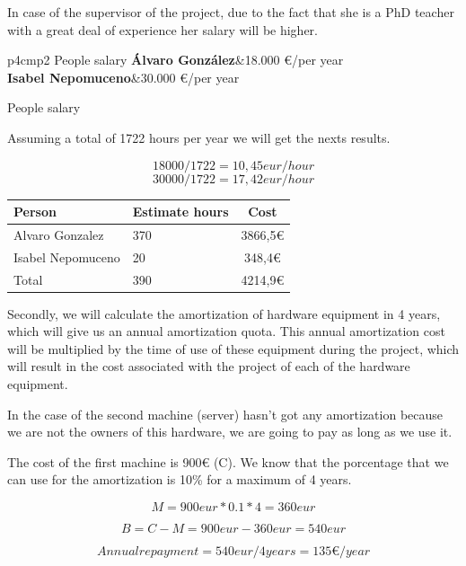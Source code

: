 In case of the supervisor of the project, due to the fact that she is a PhD teacher with a great deal of experience her salary will be higher.


\FloatBarrier
\begin{table}[htb]
	\centering
	\begin{coolTable}{p{4cm}p{\textwidth-4.5cm}}{2}
{People salary}
	\textbf{Álvaro González}&18.000 €/per year\\		
	\textbf{Isabel Nepomuceno}&30.000 €/per year\\
	\end{coolTable}
	\caption{People salary}
\end{table}
\FloatBarrier

Assuming a total of 1722 hours per year we will get the nexts results.

\[ 18000 / 1722 = 10,45 eur/hour \]
\[ 30000 / 1722 = 17,42 eur/hour \]


\begin{table}[H]
	\centering    
    \begin{tabular}{|l|l|c|}
    \hline
    Person            & Estimate hours & Cost    \\ \hline
    Alvaro Gonzalez   & 370            & 3866,5€ \\ \hline
    Isabel Nepomuceno & 20             & 348,4€  \\ \hline
    Total             & 390            & 4214,9€  \\ \hline
    \end{tabular}
\end{table}

Secondly, we will calculate the amortization of hardware equipment in 4 years, which will give us an annual amortization quota. This annual amortization cost will be multiplied by the time of use of these equipment during the project, which will result in the cost associated with the project of each of the hardware equipment.

In the case of the second machine (server) hasn't got any amortization because we are not the owners of this hardware, we are going to pay as long as we use it.

The cost of the first machine is 900€ (C). We know that the porcentage that we can use for the amortization is 10\% for a maximum of 4 years.

\[ M = 900 eur * 0.1 * 4 = 360 eur \]

\[ B = C - M = 900 eur - 360 eur = 540 eur\]

\[Annual repayment = 540 eur / 4 years = 135€/year\]

